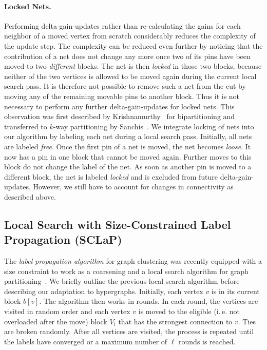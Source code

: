 \documentclass[runningheads,a4paper]{llncs}
\newcommand{\ie}{i.\,e.\xspace}
\begin{document}
\paragraph{Locked Nets.}
Performing delta-gain-updates rather than re-calculating the gains for each neighbor of a moved vertex from scratch considerably reduces the complexity of the update step.
The complexity can be reduced even further by noticing that the contribution of a net does not change any more once two of its pins have been
moved to two \emph{different} blocks. The net is then \emph{locked} in those two blocks, because neither of the two vertices is allowed to be
moved again during the current local search pass. It is therefore not possible to remove such a net from the cut by moving any of the remaining movable pins to another block. Thus it is not necessary to perform any further delta-gain-updates for locked nets.
This observation was first described by Krishnamurthy~\cite{LockedNets} for bipartitioning and transferred to $k$-way partitioning by Sanchis~\cite{HypergraphKFM}.
We integrate locking of nets into our algorithm by labeling each net during a local search pass. Initially, all nets are labeled \emph{free}.
Once the first pin of a net is moved, the net becomes \emph{loose}. It now has a pin in one block that cannot be moved again. Further moves to this 
block do not change the label of the net. As soon as another pin is moved to a different block, the net is labeled \emph{locked} and is
excluded from future delta-gain-updates. However, we still have to account for changes in connectivity as described above.

\subsection{Local Search with Size-Constrained Label Propagation (SCLaP)} \label{LPAlocalSearch}
The \emph{label propagation algorithm} for graph
clustering was recently equipped with a size constraint to work as a coarsening and a local search
algorithm for graph partitioning~\cite{LPAgraphPartitioning}. 
We briefly outline the previous local search algorithm before describing our adaptation to hypergraphs.
Initially, each vertex $v$ is in its current block $b[v]$.
The algorithm then works in rounds. In each round, the vertices are visited in random order and each
vertex $v$ is moved to the eligible (\ie not overloaded after the move) block $V_i$ 
that has the strongest connection to $v$.
Ties are broken randomly. 
After all vertices are visited, the process is repeated until the labels have converged or
a maximum number of $\ell$ rounds is reached. 
\end{document}
